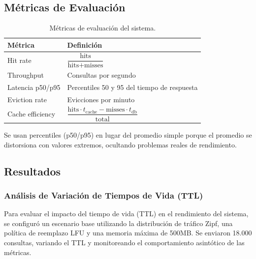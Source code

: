 \documentclass[letter,12pt]{article}
\begin{document}
\subsection{Métricas de Evaluación}

\begin{table}[H]
\centering
\begin{tabular}{ll}
\toprule
\textbf{Métrica} & \textbf{Definición} \\
\midrule
Hit rate         & $\dfrac{\text{hits}}{\text{hits} + \text{misses}}$ \\[1em]
Throughput       & Consultas por segundo \\[0.5em]
Latencia p50/p95 & Percentiles 50 y 95 del tiempo de respuesta \\[0.5em]
Eviction rate    & Evicciones por minuto \\[0.5em]
Cache efficiency & $\dfrac{\text{hits} \cdot t_{\text{cache}} - \text{misses} \cdot t_{\text{db}}}{\text{total}}$ \\
\bottomrule
\end{tabular}
\caption{Métricas de evaluación del sistema.}
\end{table}

Se usan percentiles (p50/p95) en lugar del promedio simple porque el promedio se distorsiona
con valores extremos, ocultando problemas reales de rendimiento.

\subsection{Resultados}

\subsubsection{Análisis de Variación de Tiempos de Vida (TTL)}

Para evaluar el impacto del tiempo de vida (TTL) en el rendimiento del sistema, se configuró
un escenario base utilizando la distribución de tráfico Zipf, una política de reemplazo LFU
y una memoria máxima de 500MB. Se enviaron 18.000 consultas, variando el TTL y monitoreando
el comportamiento asintótico de las métricas.
\end{document}
